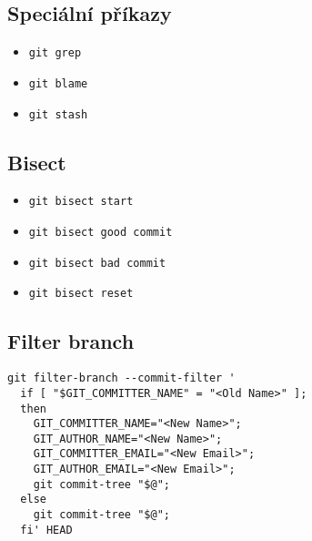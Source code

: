 \documentclass[10pt,twocolumn]{article}
\begin{document}
\subsection{Speciální příkazy}

\begin{itemize}
	\item \texttt{git grep}
	\item \texttt{git blame}
	\item \texttt{git stash}
\end{itemize}

\subsection{Bisect}

\begin{itemize}
	\item \texttt{git bisect start}
	\item \texttt{git bisect good commit}
	\item \texttt{git bisect bad commit}
	\item \texttt{git bisect reset}
\end{itemize}

\subsection{Filter branch}

\begin{verbatim}
git filter-branch --commit-filter '
  if [ "$GIT_COMMITTER_NAME" = "<Old Name>" ];
  then
    GIT_COMMITTER_NAME="<New Name>";
    GIT_AUTHOR_NAME="<New Name>";
    GIT_COMMITTER_EMAIL="<New Email>";
    GIT_AUTHOR_EMAIL="<New Email>";
    git commit-tree "$@";
  else
    git commit-tree "$@";
  fi' HEAD
\end{verbatim}
\end{document}
